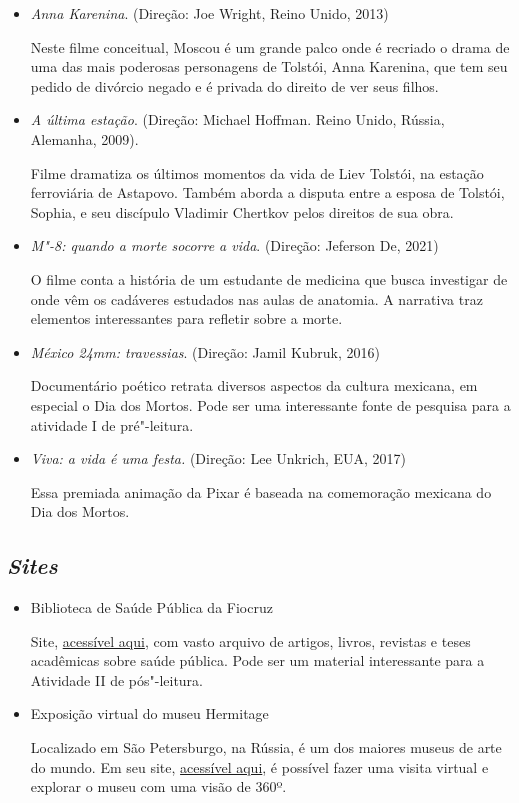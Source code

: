 \documentclass[12pt]{extarticle}
\begin{document}
\begin{itemize}
\item\textit{Anna Karenina}. (Direção: Joe Wright, Reino Unido, 2013)

Neste filme conceitual, Moscou é um grande palco onde é recriado o drama
de uma das mais poderosas personagens de Tolstói, Anna Karenina, que tem
seu pedido de divórcio negado e é privada do direito de ver seus filhos.

\item\textit{A última estação}. (Direção: Michael Hoffman. Reino Unido, Rússia,
Alemanha, 2009).

Filme dramatiza os últimos momentos da vida de Liev Tolstói, na estação
ferroviária de Astapovo. Também aborda a disputa entre a esposa de
Tolstói, Sophia, e seu discípulo Vladimir Chertkov pelos direitos de sua
obra.

\item\textit{M"-8: quando a morte socorre a vida}. (Direção: Jeferson De, 2021)

O filme conta a história de um estudante de medicina que busca investigar
de onde vêm os cadáveres estudados nas aulas de anatomia. A narrativa traz
elementos interessantes para refletir sobre a morte.

\item\textit{México 24mm: travessias}. (Direção: Jamil Kubruk, 2016)

Documentário poético retrata diversos aspectos da cultura mexicana, em especial o Dia dos Mortos. Pode ser uma interessante fonte de pesquisa para a atividade I de pré"-leitura.

\item\textit{Viva: a vida é uma festa.} (Direção: Lee Unkrich, EUA, 2017)

Essa premiada animação da Pixar é baseada na comemoração mexicana do Dia dos Mortos.
\end{itemize}

\subsection{\emph{Sites}}

\begin{itemize}

\item Biblioteca de Saúde Pública da Fiocruz

Site, \href{http://www.fiocruz.br/bibsp/cgi/cgilua.exe/sys/start.htm?sid=107}{acessível aqui}, com vasto arquivo de artigos, livros, revistas e teses acadêmicas 
sobre saúde pública. Pode ser um material interessante 
para a Atividade II de pós"-leitura.

\item Exposição virtual do museu Hermitage

Localizado em São Petersburgo, na Rússia, é um dos maiores museus de arte do mundo. Em seu site, \href{https://www.hermitagemuseum.org/wps/portal/hermitage/panorama/virtual_visit/panoramas-m-1/}{acessível aqui}, é possível fazer uma visita virtual e explorar o museu com uma visão de 360º.
\end{itemize}
\end{document}
